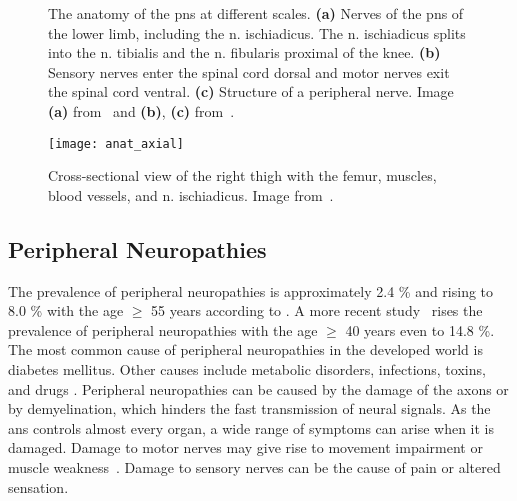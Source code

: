 \begin{figure}[htbp]
    \begin{minipage}[c][0.9\textheight][t]{.5\textwidth}
        \centering
        \vspace*{\fill}
    \end{minipage}
    \begin{minipage}[c][0.9\textheight][t]{.5\textwidth}
        \centering
        \vspace*{\fill}
        \vfill
    \end{minipage}
    \vspace*{-0.3cm}
    \caption[Anatomy of the Peripheral Nervous System]{The anatomy of the \gls{pns} at different scales. \textbf{(a)} Nerves of the \gls{pns} of the lower limb, including the \gls{n.} ischiadicus. The \gls{n.} ischiadicus splits into the \gls{n.} tibialis and the \gls{n.} fibularis proximal of the knee.  \textbf{(b)} Sensory nerves enter the spinal cord dorsal and motor nerves exit the spinal cord ventral. \textbf{(c)} Structure of a peripheral nerve. Image \textbf{(a)} from~\cite{Schunke2014PrometheusAnatomie} and \textbf{(b)}, \textbf{(c)} from~\cite{Schunke2015THIEMEAnatomy}.}
    \label{fig:anat}
\end{figure}

\begin{figure}[htbp]
	\texttt{[image: anat\_axial]}
    \caption[Cross-section of the Right Thigh]{Cross-sectional view of the right thigh with the femur, muscles, blood vessels, and \gls{n.} ischiadicus. Image from~\cite{Schunke2014PrometheusAnatomie}.}
    \label{fig:anat_axial}
\end{figure}

\subsection{Peripheral Neuropathies}
The prevalence of peripheral neuropathies is approximately 2.4 \% and rising to 8.0 \% with the age $\geq$ 55 years according to \cite{Martyn1997EpidemiologyNeuropathy}. A more recent study~\cite{Gregg2004PrevalenceSurvey} rises the prevalence of peripheral neuropathies with the age $\geq$ 40 years even to 14.8 \%. The most common cause of peripheral neuropathies in the developed world is diabetes mellitus. Other causes include metabolic disorders, infections, toxins, and drugs \cite{England2004PeripheralNeuropathy,Hughes466}.
Peripheral neuropathies can be caused by the damage of the axons or by demyelination, which hinders the fast transmission of neural signals. 
As the \gls{ans} controls almost every organ, a wide range of symptoms can arise when it is damaged. Damage to motor nerves may give rise to movement impairment or muscle weakness~\cite{Mohassel2015}. Damage to sensory nerves can be the cause of pain or altered sensation.

